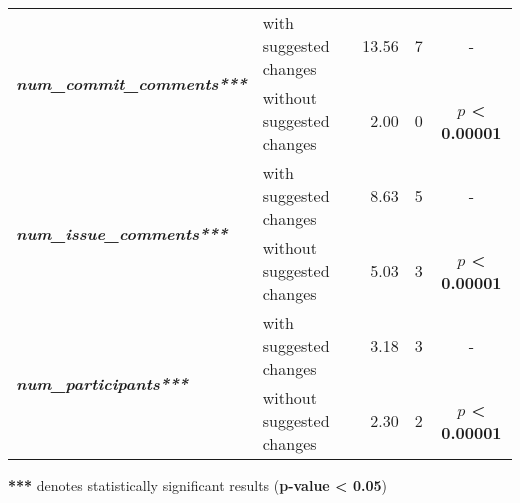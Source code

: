 \begin{table*}[tbh]
\begin{threeparttable}
\begin{tabular}{ |l|l|r|r|c| }
 \multirow{2}{*}{\textbf{\em num\_commit\_comments***}} & with suggested changes & 13.56 & 7 & - \\
 & without suggested changes & 2.00 & 0 & \textbf{$p$ < 0.00001} \\\hline
 \multirow{2}{*}{\textbf{\em num\_issue\_comments***}} & with suggested changes & 8.63 & 5 & - \\
 & without suggested changes & 5.03 & 3 & \textbf{$p$ < 0.00001} \\ \hline
 \multirow{2}{*}{\textbf{\em num\_participants***}} & with suggested changes & 3.18 & 3 & - \\
 & without suggested changes & 2.30 & 2 & \textbf{$p$ < 0.00001} \\ \hline

\end{tabular}
\begin{tablenotes}
\centering
\textbf{***} denotes statistically significant results (\textbf{p-value < 0.05})
\end{tablenotes} 
\end{threeparttable}
\label{tab:sugg-impact}
\end{table*}